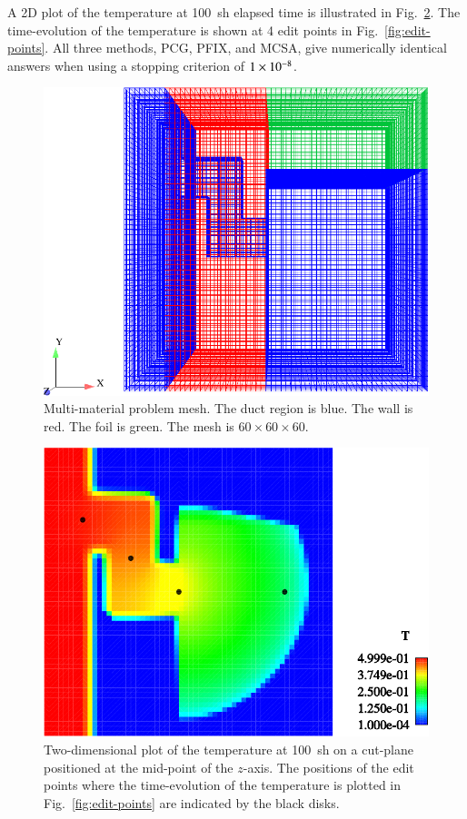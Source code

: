 \documentclass[preprint,12pt]{elsarticle}
\begin{document}
A 2D plot of the temperature at 100~sh elapsed time is illustrated in
Fig.~\ref{fig:multi-mat_T}.  The time-evolution of the temperature is
shown at 4 edit points in Fig.~\ref{fig:edit-points}.  All three
methods, PCG, PFIX, and MCSA, give numerically identical answers when
using a stopping criterion of $1\times 10^{-8}$.

\begin{figure}[htpb!]
  \centerline{
    \includegraphics[width=5in,clip]{mesh.pdf}}
  \caption{Multi-material problem mesh.  The duct region is blue.  The
    wall is red.  The foil is green.  The mesh is $60\times 60\times
    60$.}
  \label{fig:multi-mat-mesh}
\end{figure}

\begin{figure}[htpb!]
  \centerline{
    \includegraphics[width=5in,clip]{T_multi_mat.pdf}}
  \caption{
    Two-dimensional plot of the temperature at 100~sh on a cut-plane
    positioned at the mid-point of the $z$-axis.  The positions of the
    edit points where the time-evolution of the temperature is plotted
    in Fig.~\ref{fig:edit-points} are indicated by the black disks.}
  \label{fig:multi-mat_T}
\end{figure}
\end{document}
